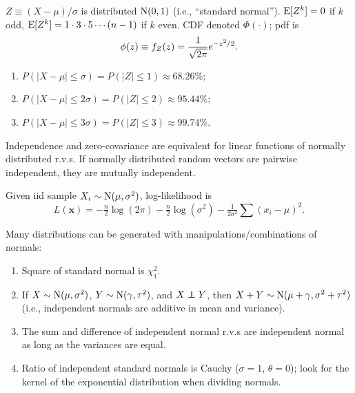 \documentclass[8pt,letterpaper, landscape]{extarticle} %
\newcommand{\mx}{\ensuremath{\mathbf{x}}}
\begin{document}
\begin{multicols}{3}
\begin{description}
$ Z \equiv (X - \mu) / \sigma $ is distributed $ \operatorname{N} (0,1) $ (i.e., ``standard normal''). $ \operatorname{E} [Z^k] = 0 $ if $ k $ odd, $ \operatorname{E} [Z^k] = 1 \cdot 3 \cdot 5 \dotsm (n-1) $ if $ k $ even. CDF denoted $ \Phi (\cdot) $; pdf is
$$ \phi(z) \equiv f_Z(z) = \frac{1}{\sqrt{2 \pi}} e^{-z^2/2}.\index{$ \phi (\cdot) $ (standard normal pdf)} $$
\begin{enumerate}
\item $ P (|X - \mu | \leq \sigma) = P (|Z| \leq 1) \approx 68.26\% $;
\item $ P (|X - \mu | \leq 2\sigma) = P (|Z| \leq 2) \approx 95.44\% $;
\item $ P (|X - \mu | \leq 3\sigma) = P (|Z| \leq 3) \approx 99.74\% $.
\end{enumerate}
Independence and zero-covariance are equivalent for linear functions of normally distributed r.v.s. If normally distributed random vectors are pairwise independent, they are mutually independent.

Given iid sample $ X_i \sim \operatorname{N}(\mu, \sigma^2) $, log-likelihood is
$$ L(\mx) = -\tfrac{n}{2} \log (2 \pi) -\tfrac{n}{2} \log (\sigma^2) - \tfrac{1}{2 \sigma^2} \sum (x_i - \mu)^2. $$

Many distributions can be generated with manipulations/combinations of normals:
\begin{enumerate}
\item Square of standard normal is $ \chi^2_1 $.
\item If $ X \sim \operatorname{N} (\mu, \sigma^2) $, $ Y \sim \operatorname{N} (\gamma, \tau^2) $, and $ X \independent Y $, then $ X + Y \sim \operatorname{N} (\mu + \gamma, \sigma^2 + \tau^2) $ (i.e., independent normals are additive in mean and variance).
\item The sum and difference of independent normal r.v.s are independent normal as long as the variances are equal.
\item Ratio of independent standard normals is Cauchy ($ \sigma = 1 $, $ \theta = 0 $); look for the kernel of the exponential distribution when dividing normals.
\end{enumerate}


\end{description}
\end{multicols}
\end{document}
